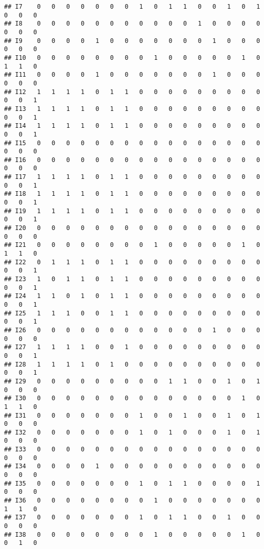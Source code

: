 \documentclass[
]{article}
\begin{document}
\begin{verbatim}
## I7    0   0   0   0   0   0   0   1   0   1   1   0   0   1   0   1   0   0   0
## I8    0   0   0   0   0   0   0   0   0   0   0   1   0   0   0   0   0   0   0
## I9    0   0   0   0   1   0   0   0   0   0   0   0   1   0   0   0   0   0   0
## I10   0   0   0   0   0   0   0   0   1   0   0   0   0   0   1   0   1   1   0
## I11   0   0   0   0   1   0   0   0   0   0   0   0   1   0   0   0   0   0   0
## I12   1   1   1   1   0   1   1   0   0   0   0   0   0   0   0   0   0   0   1
## I13   1   1   1   1   0   1   1   0   0   0   0   0   0   0   0   0   0   0   1
## I14   1   1   1   1   0   1   1   0   0   0   0   0   0   0   0   0   0   0   1
## I15   0   0   0   0   0   0   0   0   0   0   0   0   0   0   0   0   0   0   0
## I16   0   0   0   0   0   0   0   0   0   0   0   0   0   0   0   0   0   0   0
## I17   1   1   1   1   0   1   1   0   0   0   0   0   0   0   0   0   0   0   1
## I18   1   1   1   1   0   1   1   0   0   0   0   0   0   0   0   0   0   0   1
## I19   1   1   1   1   0   1   1   0   0   0   0   0   0   0   0   0   0   0   1
## I20   0   0   0   0   0   0   0   0   0   0   0   0   0   0   0   0   0   0   0
## I21   0   0   0   0   0   0   0   0   1   0   0   0   0   0   1   0   1   1   0
## I22   0   1   1   1   0   1   1   0   0   0   0   0   0   0   0   0   0   0   1
## I23   1   0   1   1   0   1   1   0   0   0   0   0   0   0   0   0   0   0   1
## I24   1   1   0   1   0   1   1   0   0   0   0   0   0   0   0   0   0   0   1
## I25   1   1   1   0   0   1   1   0   0   0   0   0   0   0   0   0   0   0   1
## I26   0   0   0   0   0   0   0   0   0   0   0   0   1   0   0   0   0   0   0
## I27   1   1   1   1   0   0   1   0   0   0   0   0   0   0   0   0   0   0   1
## I28   1   1   1   1   0   1   0   0   0   0   0   0   0   0   0   0   0   0   1
## I29   0   0   0   0   0   0   0   0   0   1   1   0   0   1   0   1   0   0   0
## I30   0   0   0   0   0   0   0   0   0   0   0   0   0   0   1   0   1   1   0
## I31   0   0   0   0   0   0   0   1   0   0   1   0   0   1   0   1   0   0   0
## I32   0   0   0   0   0   0   0   1   0   1   0   0   0   1   0   1   0   0   0
## I33   0   0   0   0   0   0   0   0   0   0   0   0   0   0   0   0   0   0   0
## I34   0   0   0   0   1   0   0   0   0   0   0   0   0   0   0   0   0   0   0
## I35   0   0   0   0   0   0   0   1   0   1   1   0   0   0   0   1   0   0   0
## I36   0   0   0   0   0   0   0   0   1   0   0   0   0   0   0   0   1   1   0
## I37   0   0   0   0   0   0   0   1   0   1   1   0   0   1   0   0   0   0   0
## I38   0   0   0   0   0   0   0   0   1   0   0   0   0   0   1   0   0   1   0

\end{verbatim}
\end{document}
